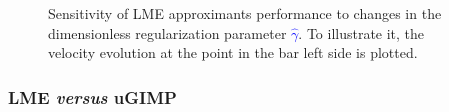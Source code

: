 \documentclass[preprint,12pt,a4paper]{elsarticle}
\begin{document}
\begin{figure}
  \centering
  \caption{Sensitivity  of LME approximants performance to changes in the
    dimensionless regularization parameter \textcolor{blue}{$\widehat{\gamma}$}. To illustrate it, the velocity evolution at the point in the bar left side is plotted.}
  \label{fig:Dyka-LME-gamma}
\end{figure}

\subsubsection{LME \textit{versus} uGIMP}
\label{sec:LME-vs-uGIMP}
\end{document}
